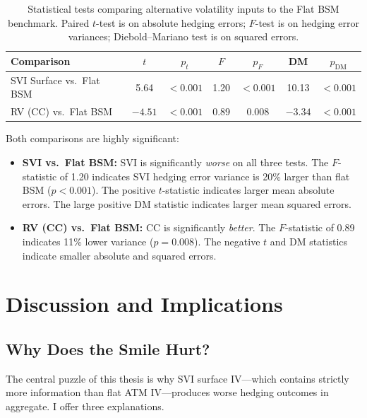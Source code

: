 \documentclass[12pt, letterpaper]{article}
\begin{document}
\begin{table}[H]
\centering
\caption{Statistical tests comparing alternative volatility inputs to the Flat BSM benchmark. Paired $t$-test is on absolute hedging errors; $F$-test is on hedging error variances; Diebold--Mariano test is on squared errors.}
\label{tab:stat_tests}
\begin{tabular}{lcccccc}
\toprule
Comparison & $t$ & $p_t$ & $F$ & $p_F$ & DM & $p_{\text{DM}}$ \\
\midrule
SVI Surface vs.\ Flat BSM & 5.64  & $< 0.001$ & 1.20 & $< 0.001$ & 10.13 & $< 0.001$ \\
RV (CC) vs.\ Flat BSM     & $-4.51$ & $< 0.001$ & 0.89 & 0.008    & $-3.34$ & $< 0.001$ \\
\bottomrule
\end{tabular}
\end{table}

Both comparisons are highly significant:
\begin{itemize}
    \item \textbf{SVI vs.\ Flat BSM:} SVI is significantly \textit{worse} on all three tests. The $F$-statistic of 1.20 indicates SVI hedging error variance is 20\% larger than flat BSM ($p < 0.001$). The positive $t$-statistic indicates larger mean absolute errors. The large positive DM statistic indicates larger mean squared errors.
    \item \textbf{RV (CC) vs.\ Flat BSM:} CC is significantly \textit{better}. The $F$-statistic of 0.89 indicates 11\% lower variance ($p = 0.008$). The negative $t$ and DM statistics indicate smaller absolute and squared errors.
\end{itemize}


\section{Discussion and Implications}
\label{sec:discussion}

\subsection{Why Does the Smile Hurt?}

The central puzzle of this thesis is why SVI surface IV---which contains strictly more information than flat ATM IV---produces worse hedging outcomes in aggregate. I offer three explanations.
\end{document}
